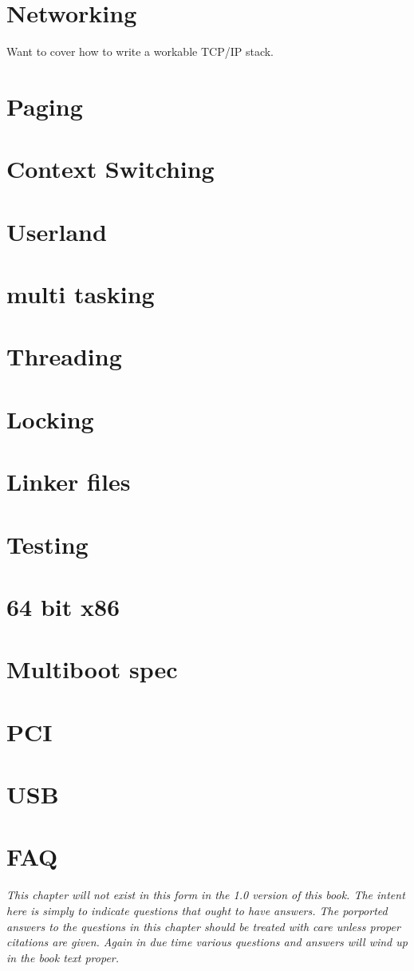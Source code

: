 \documentclass[oneside,english,final]{amsbook}
\begin{document}
\chapter{Networking}
Want to cover how to write a workable TCP/IP stack.
\chapter{Paging}
\chapter{Context Switching}
\chapter{Userland}
\chapter{multi tasking}
\chapter{Threading}
\chapter{Locking}
\chapter{Linker files}
\chapter{Testing}
\chapter{64 bit x86}
\chapter{Multiboot spec}
\chapter{PCI}
\chapter{USB}

\chapter{FAQ} {\small\textit{This chapter will not exist in this form in
    the 1.0 version of this book. The intent here is simply to indicate
    questions that ought to have answers. The porported
    answers to the questions in this chapter should be treated with care
    unless proper citations are given. Again in due time various questions
    and answers will wind up in the book text proper.}}
\end{document}
